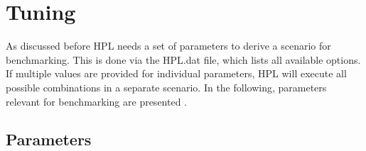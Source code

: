 \documentclass[10pt,twocolumn]{article}
\begin{document}
\section{Tuning}
\label{sec:tuning}

As discussed before HPL needs a set of parameters to derive a scenario for benchmarking. This is done via the HPL.dat file, which lists all available options. If multiple values are provided for individual parameters, HPL will execute all possible combinations in a separate scenario. In the following, parameters relevant for benchmarking are presented \cite{HPLtuning, HPLexplained}.

\subsection{Parameters}
\label{sec:tuning_parameters}
\end{document}
